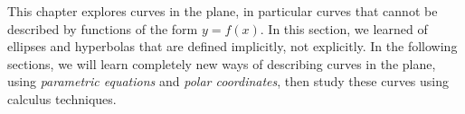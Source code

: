 This chapter explores curves in the plane, in particular curves that cannot be described by functions of the form $y=f(x)$. In this section, we learned of ellipses and hyperbolas that are defined implicitly, not explicitly. In the following sections, we will learn completely new ways of describing curves in the plane, using \emph{parametric equations} and \emph{polar coordinates}, then study these curves using calculus techniques.

